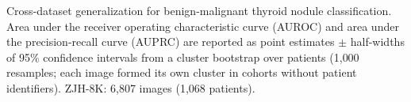 \documentclass[fleqn,10pt]{wlscirep}
\begin{document}
\begin{appendices}
\clearpage

\begin{table}[p]
\centering
\begin{threeparttable}

\caption{Cross-dataset generalization for benign-malignant thyroid nodule classification. Area under the receiver operating characteristic curve (AUROC) and area under the precision-recall curve (AUPRC) are reported as point estimates $\pm$ half-widths of 95\% confidence intervals from a cluster bootstrap over patients (1{,}000 resamples; each image formed its own cluster in cohorts without patient identifiers). ZJH-8K: 6{,}807 images (1{,}068 patients).}
\label{tab:cls_performance}

\footnotesize
\setlength{\tabcolsep}{5.5pt}
\renewcommand{\arraystretch}{1.08}


\end{threeparttable}
\end{table}
\end{appendices}
\end{document}
